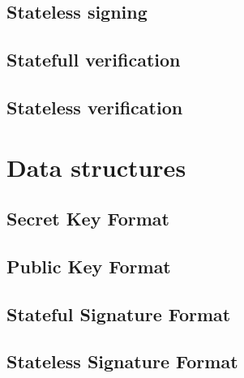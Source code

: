 \subsection{Stateless signing}

\subsection{Statefull verification}

\subsection{Stateless verification}

\section{Data structures}

\subsection{Secret Key Format}

\subsection{Public Key Format}

\subsection{Stateful Signature Format}

\subsection{Stateless Signature Format}
